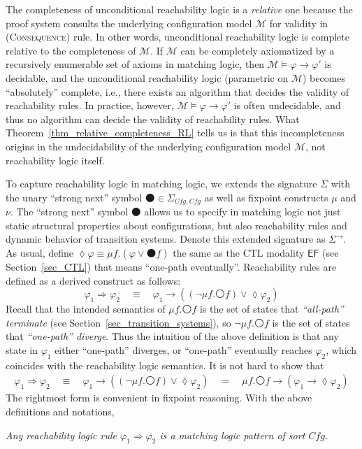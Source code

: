 \documentclass[letter,12pt]{article}
\newcommand{\imp}{\to}
\newcommand{\To}{\Rightarrow}
\newcommand{\sig}{{\Sigma}}
\newcommand{\MM}{\mathcal{M}}
\newcommand{\prule}[1]{\textsc{(#1)}}
\newcommand{\Cfg}{\mathit{Cfg}}
\newcommand{\wnext}{{\medcirc}}
\newcommand{\snext}{{\medbullet}}
\newcommand{\eventually}{{\lozenge}}
\newcommand{\EF}{{\mathsf{EF}}}
\begin{document}
The completeness of unconditional reachability logic
is a \emph{relative} one 
because the proof system consults the underlying configuration model $\MM$
for validity in \prule{Consequence} rule.
In other words, unconditional reachability logic is complete
relative to the completeness of $\MM$.
If $\MM$ can be completely axiomatized by a recursively enumerable
set of axioms in matching logic,
then $\MM \vDash \varphi \imp \varphi'$ is decidable,
and the unconditional reachability logic 
(parametric on $\MM$) becomes ``absolutely'' complete, i.e.,
there exists an algorithm that decides the validity of 
reachability rules.
In practice, however, $\MM \vDash \varphi \imp \varphi'$ is often undecidable,
and thus no algorithm can decide the validity of reachability rules.
What Theorem~\ref{thm_relative_completeness_RL} tells us is that
this incompleteness origins in the undecidability of the underlying
configuration model $\MM$, not reachability logic itself.

To capture reachability logic in matching logic, we extends the signature $\sig$
with the unary ``strong next'' symbol $\snext \in \Sigma_{\Cfg,\Cfg}$ 
as well as fixpoint constructs $\mu$ and $\nu$.
The ``strong next'' symbol $\snext$ allows us to specify in matching logic
not just static structural properties about configurations,
but also reachability rules and dynamic behavior of
transition systems.
Denote this extended signature as $\sig^\to$.
As usual, define $\eventually \varphi \equiv \mu f . (\varphi \vee \snext f)$
the same as the CTL modality $\EF$ (see Section~\ref{sec_CTL})
that means ``one-path eventually''.
Reachability rules are defined as a derived construct as follows:
$$
\varphi_1 \To \varphi_2 \quad\equiv\quad
\varphi_1 \imp ((\neg \mu f . \wnext f) \vee \eventually \varphi_2)
$$
Recall that the intended semantics of 
$\mu f . \wnext f$ is the set of states that \emph{``all-path'' terminate}
(see Section~\ref{sec_transition_systems}),
so $\neg \mu f . \wnext f$ is the set of states that 
\emph{``one-path'' diverge}.
Thus the intuition of the above definition is that
any state in $\varphi_1$ either ``one-path'' diverges, or 
``one-path'' eventually reaches $\varphi_2$,
which coincides with the reachability logic semantics.
It is not hard to show that
\begin{align*}
\varphi_1 \To \varphi_2 \quad\equiv\quad
\varphi_1 \imp ((\neg \mu f . \wnext f) \vee \eventually \varphi_2)
\quad=\quad \mu f . \wnext f \imp (\varphi_1 \imp \eventually \varphi_2)
\end{align*}
The rightmost form is convenient in fixpoint reasoning.
With the above definitions and notations,
\begin{center}
\em
Any reachability logic rule $\varphi_1 \To \varphi_2$
is a matching logic pattern of sort $\Cfg$.
\end{center}
\end{document}
